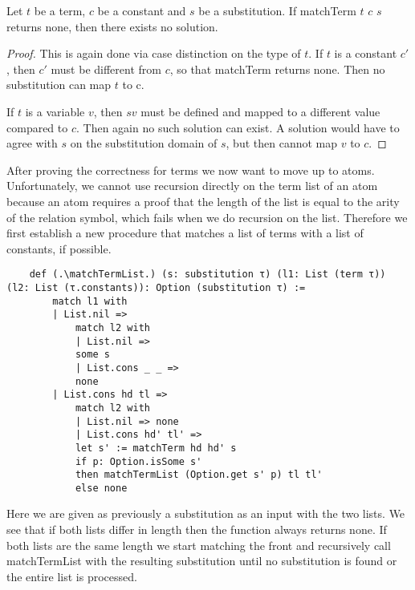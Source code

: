 \begin{lemma}[\matchTermNoneImpNoSolution]
    Let $t$ be a term, $c$ be a constant and $s$ be a substitution. If matchTerm $t$ $c$ $s$ returns none, then there exists no solution.
\end{lemma}
\begin{proof}
This is again done via case distinction on the type of $t$. If $t$ is a constant $c'$, then $c'$ must be different from $c$, so that matchTerm returns none. Then no substitution can map $t$ to c.

If $t$ is a variable $v$, then $s v$ must be defined and mapped to a different value compared to $c$. Then again no such solution can exist. A solution would have to agree with $s$ on the substitution domain of $s$, but then cannot map $v$ to $c$.
\end{proof}

After proving the correctness for terms we now want to move up to atoms. Unfortunately, we cannot use recursion directly on the term list of an atom because an atom requires a proof that the length of the list is equal to the arity of the relation symbol, which fails when we do recursion on the list. Therefore we first establish a new procedure that matches a list of terms with a list of constants, if possible.

\begin{lstlisting}
    def (.\matchTermList.) (s: substitution τ) (l1: List (term τ)) (l2: List (τ.constants)): Option (substitution τ) :=
        match l1 with
        | List.nil =>
            match l2 with
            | List.nil =>
            some s
            | List.cons _ _ =>
            none
        | List.cons hd tl =>
            match l2 with
            | List.nil => none
            | List.cons hd' tl' =>
            let s' := matchTerm hd hd' s
            if p: Option.isSome s'
            then matchTermList (Option.get s' p) tl tl'
            else none
\end{lstlisting}

Here we are given as previously a substitution as an input with the two lists. We see that if both lists differ in length then the function always returns none.
If both lists are the same length we start matching the front and recursively call matchTermList with the resulting substitution until no substitution is found or the entire list is processed.

